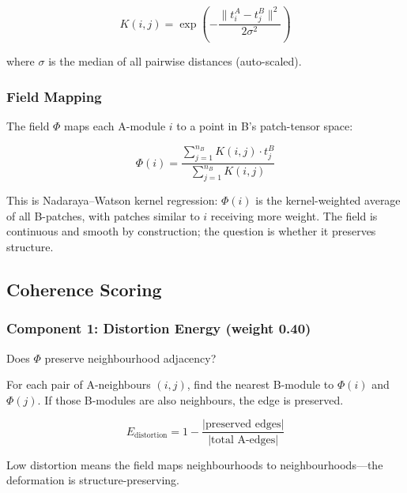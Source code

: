 \documentclass{../yalumba}
\begin{document}
\begin{equation}
  K(i, j) = \exp\!\left(
    -\frac{\|t_i^A - t_j^B\|^2}{2\sigma^2}
  \right)
  \label{eq:kernel}
\end{equation}

where $\sigma$ is the median of all pairwise distances (auto-scaled).

\subsubsection{Field Mapping}

The field $\Phi$ maps each A-module $i$ to a point in B's patch-tensor space:

\begin{equation}
  \Phi(i) = \frac{\sum_{j=1}^{n_B} K(i,j) \cdot t_j^B}
                  {\sum_{j=1}^{n_B} K(i,j)}
  \label{eq:phi}
\end{equation}


This is Nadaraya--Watson kernel regression: $\Phi(i)$ is the
kernel-weighted average of all B-patches, with patches similar to $i$
receiving more weight.  The field is continuous and smooth by construction;
the question is whether it preserves structure.

\subsection{Coherence Scoring}

\subsubsection{Component 1: Distortion Energy (weight 0.40)}

Does $\Phi$ preserve neighbourhood adjacency?

For each pair of A-neighbours $(i, j)$, find the nearest B-module to $\Phi(i)$
and $\Phi(j)$.  If those B-modules are also neighbours, the edge is preserved.

\begin{equation}
  E_{\text{distortion}} = 1 - \frac{|\text{preserved edges}|}
                                    {|\text{total A-edges}|}
  \label{eq:distortion}
\end{equation}

Low distortion means the field maps neighbourhoods to neighbourhoods---the
deformation is structure-preserving.
\end{document}
